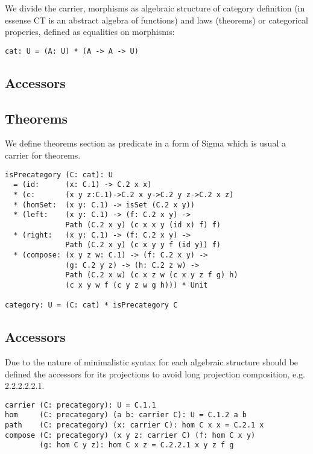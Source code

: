 \documentclass{article}
\begin{document}
We divide the carrier, morphisms as algebraic structure of category
definition (in essense CT is an abstract algebra of functions) and laws (theorems)
or categorical properies, defined as equalities on morphisms:

\begin{lstlisting}[mathescape=true]
cat: U = (A: U) * (A -> A -> U)
\end{lstlisting}

\subsection{Accessors}

\subsection{Theorems}

We define theorems section as predicate in a form of Sigma
which is usual a carrier for theorems.

\begin{lstlisting}[mathescape=true]
isPrecategory (C: cat): U
  = (id:      (x: C.1) -> C.2 x x)
  * (c:       (x y z:C.1)->C.2 x y->C.2 y z->C.2 x z)
  * (homSet:  (x y: C.1) -> isSet (C.2 x y))
  * (left:    (x y: C.1) -> (f: C.2 x y) ->
              Path (C.2 x y) (c x x y (id x) f) f)
  * (right:   (x y: C.1) -> (f: C.2 x y) ->
              Path (C.2 x y) (c x y y f (id y)) f)
  * (compose: (x y z w: C.1) -> (f: C.2 x y) ->
              (g: C.2 y z) -> (h: C.2 z w) ->
              Path (C.2 x w) (c x z w (c x y z f g) h)
              (c x y w f (c y z w g h))) * Unit

category: U = (C: cat) * isPrecategory C
\end{lstlisting}

\subsection{Accessors}

Due to the nature of minimalistic syntax for each algebraic structure
should be defined the accessors for its projections to avoid long projection
composition, e.g. 2.2.2.2.2.1.

\begin{lstlisting}[mathescape=true]
carrier (C: precategory): U = C.1.1
hom     (C: precategory) (a b: carrier C): U = C.1.2 a b
path    (C: precategory) (x: carrier C): hom C x x = C.2.1 x
compose (C: precategory) (x y z: carrier C) (f: hom C x y)
        (g: hom C y z): hom C x z = C.2.2.1 x y z f g
\end{lstlisting}
\end{document}

